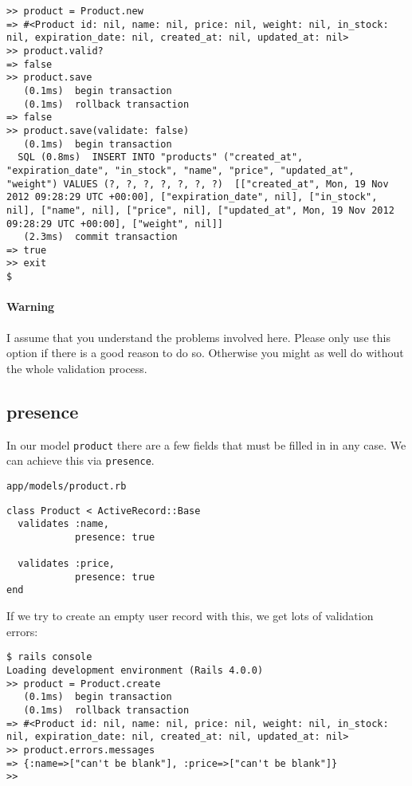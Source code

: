 \documentclass[a4paper]{book}
\begin{document}
\begin{shaded}\begin{verbatim}
>> product = Product.new
=> #<Product id: nil, name: nil, price: nil, weight: nil, in_stock: nil, expiration_date: nil, created_at: nil, updated_at: nil>
>> product.valid?
=> false
>> product.save
   (0.1ms)  begin transaction
   (0.1ms)  rollback transaction
=> false
>> product.save(validate: false)
   (0.1ms)  begin transaction
  SQL (0.8ms)  INSERT INTO "products" ("created_at", "expiration_date", "in_stock", "name", "price", "updated_at", "weight") VALUES (?, ?, ?, ?, ?, ?, ?)  [["created_at", Mon, 19 Nov 2012 09:28:29 UTC +00:00], ["expiration_date", nil], ["in_stock", nil], ["name", nil], ["price", nil], ["updated_at", Mon, 19 Nov 2012 09:28:29 UTC +00:00], ["weight", nil]]
   (2.3ms)  commit transaction
=> true
>> exit
$
\end{verbatim}\end{shaded}

\paragraph{Warning}\label{warning-6}

I assume that you understand the problems involved here. Please only use this option if there is a good reason to do so. Otherwise you might as well do without the whole validation process.

\subsection{presence}\label{presence}

In our model \texttt{product} there are a few fields that must be filled in in any case. We can achieve this via \texttt{presence}.

\texttt{app/models/product.rb}

\begin{shaded}\begin{verbatim}
class Product < ActiveRecord::Base
  validates :name,
            presence: true

  validates :price,
            presence: true
end
\end{verbatim}\end{shaded}

If we try to create an empty user record with this, we get lots of validation errors:

\begin{shaded}\begin{verbatim}
$ rails console
Loading development environment (Rails 4.0.0)
>> product = Product.create
   (0.1ms)  begin transaction
   (0.1ms)  rollback transaction
=> #<Product id: nil, name: nil, price: nil, weight: nil, in_stock: nil, expiration_date: nil, created_at: nil, updated_at: nil>
>> product.errors.messages
=> {:name=>["can't be blank"], :price=>["can't be blank"]}
>>
\end{verbatim}\end{shaded}
\end{document}
